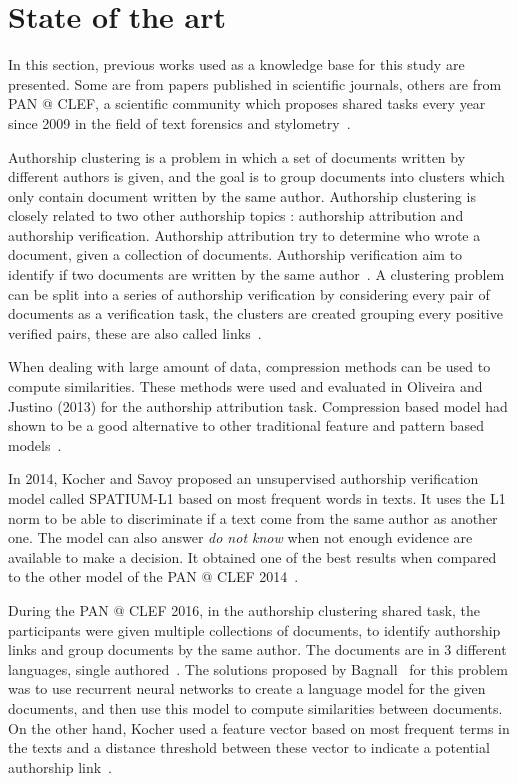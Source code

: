 \chapter{State of the art \label{sec:state_of_the_art}}

In this section, previous works used as a knowledge base for this study are presented.
Some are from papers published in scientific journals, others are from PAN @ CLEF, a scientific community which proposes shared tasks every year since 2009 in the field of text forensics and stylometry~\cite{pan_webis}.

Authorship clustering is a problem in which a set of documents written by different authors is given, and the goal is to group documents into clusters which only contain document written by the same author.
Authorship clustering is closely related to two other authorship topics : authorship attribution and authorship verification.
Authorship attribution try to determine who wrote a document, given a collection of documents.
Authorship verification aim to identify if two documents are written by the same author~\cite{pan11_verif}.
A clustering problem can be split into a series of authorship verification by considering every pair of documents as a verification task, the clusters are created grouping every positive verified pairs, these are also called links~\cite{pan16_clustering_site}.

When dealing with large amount of data, compression methods can be used to compute similarities.
These methods were used and evaluated in Oliveira and Justino (2013) for the authorship attribution task.
Compression based model had shown to be a good alternative to other traditional feature and pattern based models~\cite{comparing_compression}.

In 2014, Kocher and Savoy proposed an unsupervised authorship verification model called \textsc{SPATIUM-L1} based on most frequent words in texts.
It uses the L1 norm to be able to discriminate if a text come from the same author as another one.
The model can also answer \textit{do not know} when not enough evidence are available to make a decision.
It obtained one of the best results when compared to the other model of the PAN @ CLEF 2014~\cite{kocher_linking}.

During the PAN @ CLEF 2016, in the authorship clustering shared task, the participants were given multiple collections of documents, to identify authorship links and group documents by the same author.
The documents are in 3 different languages, single authored~\cite{pan16}.
The solutions proposed by Bagnall~\cite{bagnall_pan16} for this problem was to use recurrent neural networks to create a language model for the given documents, and then use this model to compute similarities between documents.
On the other hand, Kocher used a feature vector based on most frequent terms in the texts and a distance threshold between these vector to indicate a potential authorship link~\cite{kocher_pan16}.

